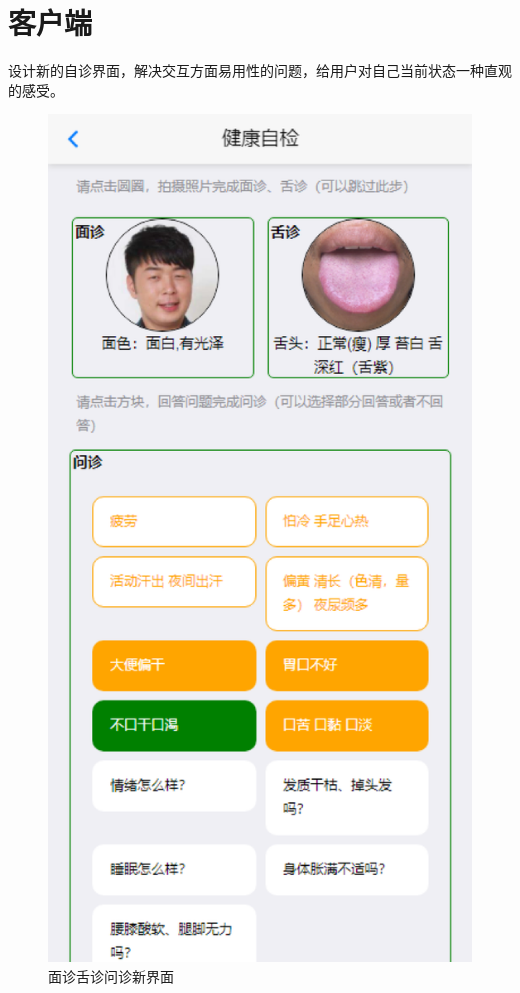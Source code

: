 \section{客户端}
设计新的自诊界面，解决交互方面易用性的问题，给用户对自己当前状态一种直观的感受。
\begin{figure}
    \centering
    \includegraphics{images/diag.png}
    \caption{面诊舌诊问诊新界面}
    \label{fig:diag_new}
\end{figure}

